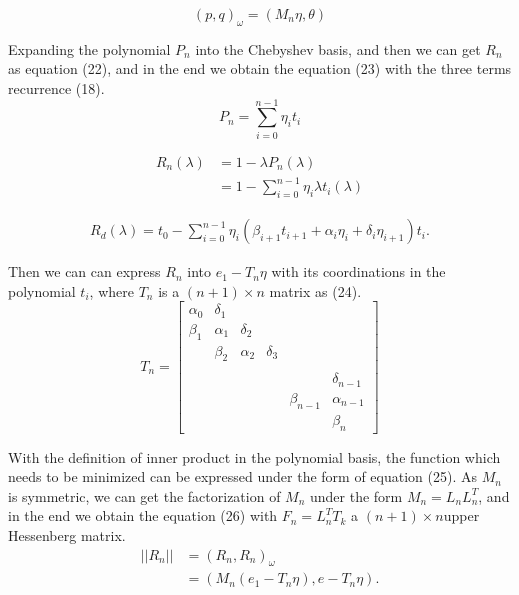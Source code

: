 {\begin{equation}
(p,q)_\omega=(M_n\eta, \theta)
\end{equation}

Expanding the polynomial \(P_n\) into the Chebyshev basis, and then we can get \(R_n\) as equation (22), and in the end we obtain the equation (23) with the three terms recurrence (18). 
\begin{equation}
P_n=\sum_{i=0}^{n-1}\eta_i t_i
\end{equation}

\begin{equation}
\begin{aligned}
R_n(\lambda)&=1-\lambda P_n(\lambda)\\ &=1-\sum_{i=0}^{n-1} \eta_i \lambda t_i(\lambda)
\end{aligned}
\end{equation}

\begin{equation}
\begin{aligned}
R_d(\lambda) =t_0-\sum_{i=0}^{n-1} \eta_i (\beta_{i+1}t_{i+1}+\alpha_i \eta_i + \delta_i \eta_{i+1})t_i.
\end{aligned}
\end{equation}

Then we can can express \(R_n\) into \(e_1-T_n \eta\) with its coordinations in the polynomial \(t_i\), where \(T_n\) is a \((n+1) \times n\) matrix as (24).
\begin{equation}
T_n=
\begin{bmatrix}
\alpha_0       & \delta_1  \\
\beta_1       & \alpha_1 & \delta_2  \\
&  \beta_2 & \alpha_2  & \delta_3\\
& \\
& && &&\delta_{n-1} \\
& && &\beta_{n-1}&\alpha_{n-1} \\
& && &&\beta_{n}
\end{bmatrix}
\end{equation}

With the definition of inner product in the polynomial basis, the function which needs to be minimized can be expressed under the form of equation (25). As \(M_n\) is symmetric, we can get the factorization of \(M_n\) under the form \(M_n=L_n L_n^T\), and in the end we obtain the equation (26) with \(F_n=L_n^TT_k\) a \((n+1) \times n\)upper Hessenberg matrix.
\begin{equation}
\begin{aligned}
||R_n|| &=(R_n,R_n)_\omega \\ &=(M_n(e_1-T_n\eta),e-T_n\eta).
\end{aligned}
\end{equation}

}
